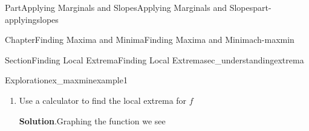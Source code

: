 \documentclass{tufte-book}
\newcommand{\blocktitlefont}{\relax}
\numberwithin{equation}{chapter}
\newcommand{\ddx}[1]{ \dfrac{d}{dx} \Big[ #1 \Big]  }
\newcommand{\amp}{&}
\begin{document}
\begin{partptx}{Part}{Applying Marginals and Slopes}{}{Applying Marginals and Slopes}{}{}{part-applyingslopes}
\begin{chapterptx}{Chapter}{Finding Maxima and Minima}{}{Finding Maxima and Minima}{}{}{ch-maxmin}
\begin{sectionptx}{Section}{Finding Local Extrema}{}{Finding Local Extrema}{}{}{sec_understandingextrema}
\begin{exploration}{Exploration}{}{ex_maxminexample1}
\begin{enumerate}[font=\bfseries,label=(\alph*),ref=\alph*]
\begin{align*}
= \amp \ddx{ \frac{-1}{3} x^3 } + \ddx{x} + \ddx{1} \\
= \amp \frac{-1}{3} \ddx{x^3} + 1 + 0\\
= \amp \frac{-1}{3}\cdot 3x^2 + + 1\\
= \amp -x^2 + 1
\end{align*}
%
\par
To find when \(f'=0\), simply solve the equation%
\begin{equation*}
-x^2 + 1 = 0
\end{equation*}
Solve the equation by factoring. It is easier to factor equations when the highest power term has a factor of 1.  To do this, multiply both sides of the equation by -1, simplifying, and factoring%
\begin{align*}
(-1) \cdot (-x^2 + 1) \amp =(-1) \cdot = 0 \\
x^2 - 1 \amp = 0 \\
(x+1) (x-1) \amp  = 0
\end{align*}
The only way this can happen is if either the first or second terms equal 0.  In other words, solve%
\begin{align*}
x+1 = 0 \amp \text{ or } \amp x-1=0 \\
x = -1 \amp \text{ or } \amp x=1
\end{align*}
%
\par
We have a singularity when \(f'\ DNE\). Looking at the graph of \(f\), it does not look like there are any singularities.%
\par
Looking at the function, the derivative \(f'(x) = -x^2+1\) is always defined. This confirms that this function \(f\) does not have any singularities.%
\item{}Use a calculator to find the local extrema for \(f\)%
\par\smallskip%
\noindent\textbf{\blocktitlefont Solution}.\hypertarget{ex_maxminexample1-3-2}{}\quad{}Graphing the function we see \begin{image}{0.25}{0.5}{0.25}{}%
%
\end{image}%

\end{enumerate}
\end{exploration}
\end{sectionptx}
\end{chapterptx}
\end{partptx}
\end{document}
